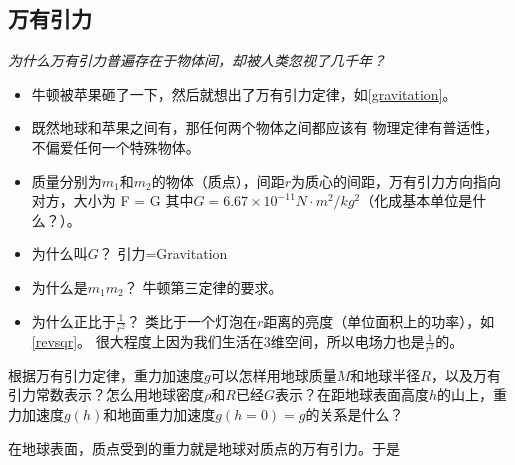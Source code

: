 \documentclass[a4paper,9pt]{ctexart}
\begin{document}
\subsection{万有引力}
\emph{为什么万有引力普遍存在于物体间，却被人类忽视了几千年？}
\begin{itemize}
\item
{}牛顿被苹果砸了一下，然后就想出了万有引力定律，如\cref{gravitation}。
\item
既然地球和苹果之间有，那任何两个物体之间都应该有 \so 物理定律有普适性，不偏爱任何一个特殊物体。
\item
质量分别为$m_1$和$m_2$的物体（质点），间距$r$为质心的间距，万有引力方向指向对方，大小为
\beq
F = G 
\eeq
其中$G = 6.67\times 10^{-11}\unit{N\cdot m^2/kg^2}$（化成基本单位是什么？）。
\item
为什么叫$G$？ \so 引力=Gravitation
\item
为什么是$m_1m_2$？ \so 牛顿第三定律的要求。
\item
为什么正比于$\frac{1}{r^2}$？ \so 类比于一个灯泡在$r$距离的亮度（单位面积上的功率），如\cref{revsqr}。 \so 很大程度上因为我们生活在3维空间，所以电场力也是$\frac{1}{r^2}$的。
\end{itemize}
\begin{eg}
根据万有引力定律，重力加速度$g$可以怎样用地球质量$M$和地球半径$R$，以及万有引力常数表示？怎么用地球密度$\rho$和$R$已经$G$表示？在距地球表面高度$h$的山上，重力加速度$g(h)$和地面重力加速度$g(h=0) = g$的关系是什么？
\end{eg}
\begin{ans}
在地球表面，质点受到的重力就是地球对质点的万有引力。于是
\vspace{6cm}
\end{ans}
\end{document}
